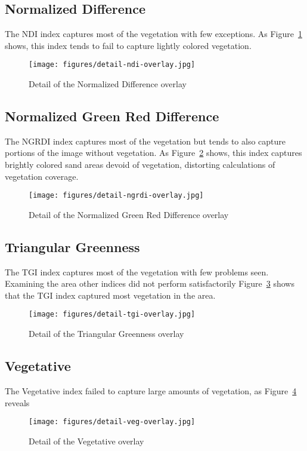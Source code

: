 \documentclass[letterpaper]{article}
\begin{document}
{{\subsection{Normalized Difference}
The NDI index captures most of the vegetation with few exceptions. As Figure~\ref{fig:detail-ndi} shows, this index tends to fail to capture lightly colored vegetation.
\begin{figure}[H]
	\centering
	\texttt{[image: figures/detail-ndi-overlay.jpg]}
	\caption{Detail of the Normalized Difference overlay}
	\label{fig:detail-ndi}
\end{figure}

\subsection{Normalized Green Red Difference}
The NGRDI index captures most of the vegetation but tends to also capture portions of the image without vegetation. As Figure~\ref{fig:detail-ngrdi} shows, this index captures brightly colored sand areas devoid of vegetation, distorting calculations of vegetation coverage.
\begin{figure}[H]
	\centering
	\texttt{[image: figures/detail-ngrdi-overlay.jpg]}
	\caption{Detail of the Normalized Green Red Difference overlay}
	\label{fig:detail-ngrdi}
\end{figure}

\subsection{Triangular Greenness}
The TGI index captures most of the vegetation with few problems seen. Examining the area other indices did not perform satisfactorily  Figure~\ref{fig:detail-tgi} shows that the TGI index captured most vegetation in the area. 
\begin{figure}[H]
	\centering
	\texttt{[image: figures/detail-tgi-overlay.jpg]}
	\caption{Detail of the Triangular Greenness overlay}
	\label{fig:detail-tgi}
\end{figure}

\subsection{Vegetative}
The Vegetative index failed to capture large amounts of vegetation, as Figure~\ref{fig:detail-veg} reveals 
\begin{figure}[H]
	\centering
	\texttt{[image: figures/detail-veg-overlay.jpg]}
	\caption{Detail of the Vegetative overlay}
	\label{fig:detail-veg}
\end{figure}

}}
\end{document}
